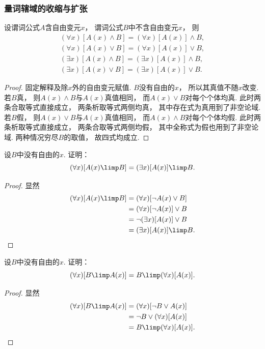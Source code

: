 \subsubsection{量词辖域的收缩与扩张}
设谓词公式\(A\)含自由变元\(x\)，
谓词公式\(B\)中不含自由变元\(x\)，
则\begin{gather}
	(\forall x)[A(x) \land B]
	= (\forall x)[A(x)] \land B, \\
	(\forall x)[A(x) \lor B]
	= (\forall x)[A(x)] \lor B, \\
	(\exists x)[A(x) \land B]
	= (\exists x)[A(x)] \land B, \\
	(\exists x)[A(x) \lor B]
	= (\exists x)[A(x)] \lor B.
\end{gather}
\begin{proof}
    固定解释及除\(x\)外的自由变元赋值.
    \(B\)没有自由的\(x\)，
    所以其真值不随\(x\)改变.
    若\(B\)真，
    则\(A(x)\land B\)与\(A(x)\)真值相同，
    而\(A(x)\lor B\)对每个个体均真.
    此时两条合取等式直接成立，
    两条析取等式两侧均真，
    其中存在式为真用到了非空论域.
    若\(B\)假，
    则\(A(x)\lor B\)与\(A(x)\)真值相同，
    而\(A(x)\land B\)对每个个体均假.
    此时两条析取等式直接成立，
    两条合取等式两侧均假，
    其中全称式为假也用到了非空论域.
    两种情况穷尽\(B\)的取值，
    故四式均成立.
\end{proof}


\begin{example}
    设\(B\)中没有自由的\(x\).
证明：\begin{equation}
	(\forall x)[A(x) \limp B]
	= (\exists x)[A(x)] \limp B.
\end{equation}
\begin{proof}
显然\begin{align*}
	(\forall x)[A(x) \limp B]
	&= (\forall x)[\neg A(x) \lor B] \\
	&= (\forall x)[\neg A(x)] \lor B \\
	&= \neg(\exists x)[A(x)] \lor B \\
	&= (\exists x)[A(x)] \limp B.
	\qedhere
\end{align*}
\end{proof}
\end{example}

\begin{example}
    设\(B\)中没有自由的\(x\).
证明：\begin{equation}
	(\forall x)[B \limp A(x)]
	= B \limp (\forall x)[A(x)].
\end{equation}
\begin{proof}
显然\begin{align*}
	(\forall x)[B \limp A(x)]
	&= (\forall x)[\neg B \lor A(x)] \\
	&= \neg B \lor (\forall x)[A(x)] \\
	&= B \limp (\forall x)[A(x)].
	\qedhere
\end{align*}
\end{proof}
\end{example}

